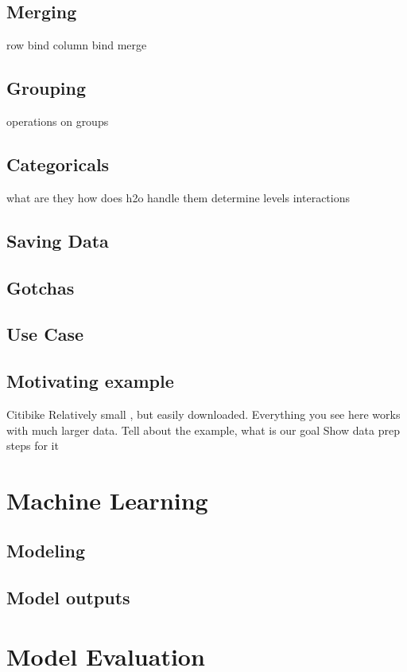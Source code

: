 \subsection{Merging}
row bind
column bind
merge

\subsection{Grouping}
operations on groups


\subsection{Categoricals}
what are they
how does h2o handle them
determine levels
interactions

\subsection{Saving Data}

\subsection{Gotchas}

\subsection{Use Case}
\subsection{Motivating example}
Citibike
Relatively small , but easily downloaded.  Everything you see here works with much larger data.
Tell about the example, what is our goal
Show data prep steps for it

\section{Machine Learning}
\subsection{Modeling}
\subsection{Model outputs}

\section{Model Evaluation}

